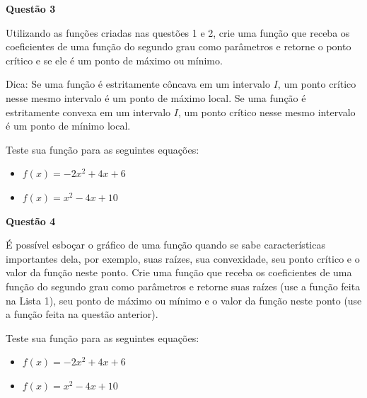 \documentclass[12pt, a4paper]{article}
\begin{document}
\textbf{Questão 3}

Utilizando as funções criadas nas questões 1 e 2, crie uma função que receba os coeficientes de uma função do segundo grau como parâmetros e retorne o ponto crítico e se ele é um ponto de máximo ou mínimo. 

Dica: Se uma função é estritamente côncava em um intervalo $I$, um ponto crítico nesse mesmo intervalo é um ponto de máximo local. Se uma função é estritamente convexa em um intervalo $I$, um ponto crítico nesse mesmo intervalo é um ponto de mínimo local.

Teste sua função para as seguintes equações:

\begin{itemize}
	\item $f(x) = -2x^2 + 4x + 6$
	\item $f(x) = x^2 - 4x + 10$
\end{itemize}



\textbf{Questão 4}

É possível esboçar o gráfico de uma função quando se sabe características importantes dela, por exemplo, suas raízes, sua convexidade, seu ponto crítico e o valor da função neste ponto. Crie uma função que receba os coeficientes de uma função do segundo grau como parâmetros e retorne suas raízes (use a função feita na Lista 1), seu ponto de máximo ou mínimo e o valor da função neste ponto (use a função feita na questão anterior).

Teste sua função para as seguintes equações:

\begin{itemize}
	\item $f(x) = -2x^2 + 4x + 6$
	\item $f(x) = x^2 - 4x + 10$
\end{itemize}


	
\end{document}
